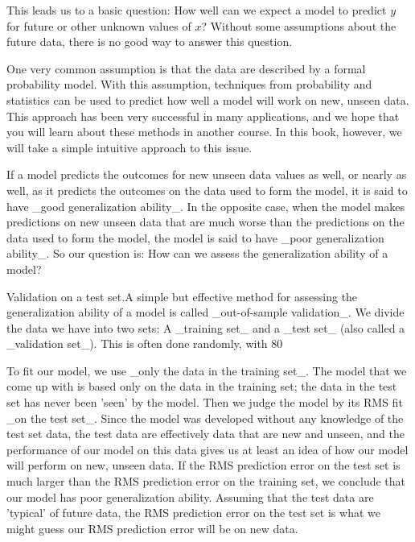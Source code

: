 This leads us to a basic question: How well can we expect a model to predict \(y\) for future or other unknown values of \(x\)? Without some assumptions about the future data, there is no good way to answer this question.

One very common assumption is that the data are described by a formal probability model. With this assumption, techniques from probability and statistics can be used to predict how well a model will work on new, unseen data. This approach has been very successful in many applications, and we hope that you will learn about these methods in another course. In this book, however, we will take a simple intuitive approach to this issue.

If a model predicts the outcomes for new unseen data values as well, or nearly as well, as it predicts the outcomes on the data used to form the model, it is said to have _good generalization ability_. In the opposite case, when the model makes predictions on new unseen data that are much worse than the predictions on the data used to form the model, the model is said to have _poor generalization ability_. So our question is: How can we assess the generalization ability of a model?

Validation on a test set.A simple but effective method for assessing the generalization ability of a model is called _out-of-sample validation_. We divide the data we have into two sets: A _training set_ and a _test set_ (also called a _validation set_). This is often done randomly, with 80%

To fit our model, we use _only the data in the training set_. The model that we come up with is based only on the data in the training set; the data in the test set has never been 'seen' by the model. Then we judge the model by its RMS fit _on the test set_. Since the model was developed without any knowledge of the test set data, the test data are effectively data that are new and unseen, and the performance of our model on this data gives us at least an idea of how our model will perform on new, unseen data. If the RMS prediction error on the test set is much larger than the RMS prediction error on the training set, we conclude that our model has poor generalization ability. Assuming that the test data are 'typical' of future data, the RMS prediction error on the test set is what we might guess our RMS prediction error will be on new data.

